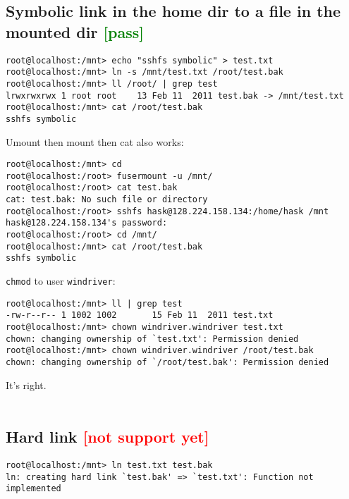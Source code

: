 \documentclass[a4paper]{report}
\begin{document}
\begin{enumerate}
\subsection{Symbolic link in the home dir to a file in the mounted dir
            \textcolor{green}{[pass]}}
\begin{lstlisting}
root@localhost:/mnt> echo "sshfs symbolic" > test.txt
root@localhost:/mnt> ln -s /mnt/test.txt /root/test.bak 
root@localhost:/mnt> ll /root/ | grep test
lrwxrwxrwx 1 root root    13 Feb 11  2011 test.bak -> /mnt/test.txt
root@localhost:/mnt> cat /root/test.bak 
sshfs symbolic
\end{lstlisting}
Umount then mount then cat also works:
\begin{lstlisting}
root@localhost:/mnt> cd 
root@localhost:/root> fusermount -u /mnt/
root@localhost:/root> cat test.bak 
cat: test.bak: No such file or directory
root@localhost:/root> sshfs hask@128.224.158.134:/home/hask /mnt
hask@128.224.158.134's password: 
root@localhost:/root> cd /mnt/
root@localhost:/mnt> cat /root/test.bak 
sshfs symbolic
\end{lstlisting}
{\tt chmod} to user {\tt windriver}:
\begin{lstlisting}
root@localhost:/mnt> ll | grep test
-rw-r--r-- 1 1002 1002       15 Feb 11  2011 test.txt
root@localhost:/mnt> chown windriver.windriver test.txt 
chown: changing ownership of `test.txt': Permission denied
root@localhost:/mnt> chown windriver.windriver /root/test.bak 
chown: changing ownership of `/root/test.bak': Permission denied
\end{lstlisting}
It's right.\\\\
\subsection{Hard link \textcolor{red}{[not support yet]}}
\begin{lstlisting}
root@localhost:/mnt> ln test.txt test.bak 
ln: creating hard link `test.bak' => `test.txt': Function not implemented
\end{lstlisting}\null\\

\end{enumerate}
\end{document}
